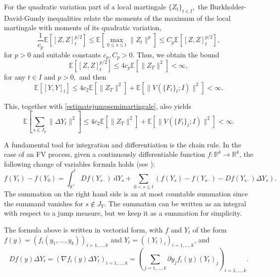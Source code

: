 \documentclass[reqno,12pt]{amsart}
\theoremstyle{plain} %
\theoremstyle{definition} %
\begin{document}
For the quadratic variation part of a local martingale $\{Z_t\}_{t\in I},$ the Burkholder-David-Gundy inequalities \cite[Theorem IV.48]{Protter2005} relate the moments of the maximum of the local martingale with moments of its quadratic variation,
\[
    \frac{1}{c_p}\mathbb{E}\left[[Z, Z]_t^{p/2}\right] \leq \mathbb{E}\left[\max_{0\leq s \leq t} \|Z_t\|^p\right] \leq C_p\mathbb{E}\left[[Z, Z]_t^{p/2}\right],
\]
for $p > 0$ and suitable constants $c_p, C_p > 0.$ Thus, we obtain the bound
\[
    \mathbb{E}\left[[Z, Z]_t^{p/2}\right] \leq 4c_p\mathbb{E}\left[\|Z_T\|^2\right] < \infty,
\]
for any $t\in I$ and $p > 0,$ and then
\begin{equation}
    \label{expectationofquadraticvariation}
    \mathbb{E}\left[[Y, Y]_t\right] \leq 4c_2\mathbb{E}\left[\|Z_T\|^2\right] + \mathbb{E}\left[\|V(\{F_t\}_t; I)\|^2\right] < \infty.
\end{equation}

This, together with \eqref{estimatejumpsemimartingale}, also yields
\begin{equation}
    \label{expectationsquaredjumps}
    \mathbb{E}\left[\sum_{s\in J_{Y}} \|\Delta Y_t\|^2 \right] \leq 4c_2\mathbb{E}\left[\|Z_T\|^2\right] + \mathbb{E}\left[\|V(\{F_t\}_t; I)\|^2\right] < \infty.
\end{equation}

A fundamental tool for integration and differentiation is the chain rule. In the case of an FV process, given a continuously differentiable function $f:\mathbb{R}^k \rightarrow \mathbb{R}^k$, the following change of variables formula holds (see \cite[Theorems II.31 and II.33]{Protter2005}):
\begin{equation}
    f(Y_t) - f(Y_0) = \int_{0^+}^t Df(Y_{s^-}) \;\mathrm{d}Y_s + \sum_{0 < s \leq t} \left( f(Y_s) - f(Y_{s^{-}}) - Df(Y_{s^-})\Delta Y_s\right).
\end{equation}
The summation on the right hand side is an at most countable summation since the summand vanishes for $s \notin J_{Y}$. The summation can be written as an integral with respect to a jump measure, but we keep it as a summation for simplicity.

The formula above is written in vectorial form, with $f$ and $Y_t$ of the form $f(y)=(f_i(y_1, \ldots, y_k))_{i=1, \ldots, k}$ and $Y_t = ((Y_t)_i)_{i=1, \ldots, k}$, and
\[
    Df(y)\Delta Y_t = \left( \nabla f_i(y)\Delta Y_t\right)_{i=1, \ldots, k} = \left( \sum_{j=1, \ldots, k} \partial y_j f_i(y) (Y_t)_j \right)_{i=1, \ldots, k}.
\]
\end{document}
